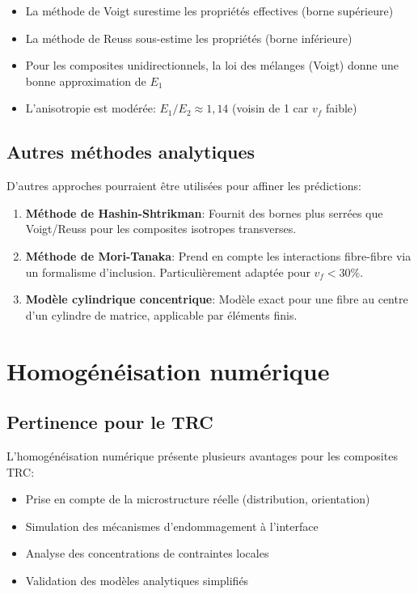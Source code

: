 \documentclass{rapportECL}
\begin{document}
\begin{itemize}
\item La méthode de Voigt surestime les propriétés effectives (borne supérieure)
\item La méthode de Reuss sous-estime les propriétés (borne inférieure)
\item Pour les composites unidirectionnels, la loi des mélanges (Voigt) donne une bonne approximation de $E_1$
\item L'anisotropie est modérée: $E_1/E_2 \approx 1,14$ (voisin de 1 car $v_f$ faible)
\end{itemize}

\subsection{Autres méthodes analytiques}

D'autres approches pourraient être utilisées pour affiner les prédictions:

\begin{enumerate}
\item \textbf{Méthode de Hashin-Shtrikman}: Fournit des bornes plus serrées que Voigt/Reuss pour les composites isotropes transverses.

\item \textbf{Méthode de Mori-Tanaka}: Prend en compte les interactions fibre-fibre via un formalisme d'inclusion. Particulièrement adaptée pour $v_f < 30\%$.

\item \textbf{Modèle cylindrique concentrique}: Modèle exact pour une fibre au centre d'un cylindre de matrice, applicable par éléments finis.
\end{enumerate}

\section{Homogénéisation numérique}

\subsection{Pertinence pour le TRC}

L'homogénéisation numérique présente plusieurs avantages pour les composites TRC:

\begin{itemize}
\item Prise en compte de la microstructure réelle (distribution, orientation)
\item Simulation des mécanismes d'endommagement à l'interface
\item Analyse des concentrations de contraintes locales
\item Validation des modèles analytiques simplifiés
\end{itemize}
\end{document}
